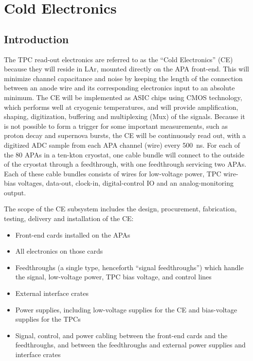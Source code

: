 \chapter{Cold Electronics}
\label{ch:ce}

%
\section{Introduction}
\label{sec:ce_intro}

The TPC read-out electronics are referred to as the ``Cold Electronics'' (CE) because they will reside in LAr,
mounted directly on the APA front-end.
This will minimize channel capacitance and noise by keeping the length of the connection between an anode wire
and its corresponding electronics input to an absolute minimum.
The CE will be implemented as ASIC chips using CMOS technology, which performs well at cryogenic temperatures,
and will provide amplification, shaping, digitization, buffering and multiplexing (Mux) of the signals.
Because it is not possible to form a trigger for some important measurements,
such as proton decay and supernova bursts, the CE will be continuously read out,
with a digitized ADC sample from each APA channel (wire) every 500~ns.
For each of the 80 APAs in a ten-kton cryostat, one cable bundle will connect to the outside of the cryostat through
a feedthrough, with one feedthrough servicing two APAs.
Each of these cable bundles consists of wires for low-voltage power, TPC wire-bias voltages, data-out, clock-in,
digital-control IO and an analog-monitoring output.

The scope of the CE subsystem includes the design, procurement, fabrication, testing,
delivery and installation of the CE:
\begin{itemize}
\item Front-end cards installed on the APAs
\item All electronics on those cards
\item Feedthroughs (a single type, henceforth ``signal feedthroughs'') which handle the signal,
low-voltage power, TPC bias voltage, and control lines
\item External interface crates
\item Power supplies, including low-voltage supplies for the CE and bias-voltage supplies for the TPCs
\item Signal, control, and power cabling between the front-end cards and the feedthroughs,
and between the feedthroughs and external power supplies and interface crates
\end{itemize}

